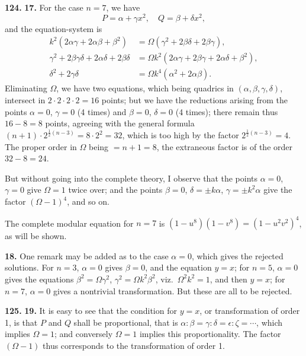 \documentclass[11pt,a4paper]{article}
\theoremstyle{plain}
\begin{document}
\noindent\textbf{124.} \textbf{17.} For the case $n = 7$, we have
\[
P = \alpha + \gamma x^2, \quad Q = \beta + \delta x^2,
\]
and the equation-system is
\begin{align*}
k^2(2\alpha\gamma + 2\alpha\beta + \beta^2) &= \Omega(\gamma^2 + 2\beta\delta + 2\beta\gamma), \\
\gamma^2 + 2\beta\gamma\delta + 2\alpha\delta + 2\beta\delta &= \Omega k^2(2\alpha\gamma + 2\beta\gamma + 2\alpha\delta + \beta^2), \\
\delta^2 + 2\gamma\delta &= \Omega k^4(\alpha^2 + 2\alpha\beta).
\end{align*}
Eliminating $\Omega$, we have two equations, which being quadrics in $(\alpha, \beta, \gamma, \delta)$, intersect in $2 \cdot 2 \cdot 2 \cdot 2 = 16$ points; but we have the reductions arising from the points $\alpha = 0$, $\gamma = 0$ (4 times) and $\beta = 0$, $\delta = 0$ (4 times); there remain thus $16 - 8 = 8$ points, agreeing with the general formula $(n + 1) \cdot 2^{\frac{1}{2}(n-3)} = 8 \cdot 2^2 = 32$, which is too high by the factor $2^{\frac{1}{2}(n-3)} = 4$. The proper order in $\Omega$ being $= n + 1 = 8$, the extraneous factor is of the order $32 - 8 = 24$.

But without going into the complete theory, I observe that the points $\alpha = 0$, $\gamma = 0$ give $\Omega = 1$ twice over; and the points $\beta = 0$, $\delta = \pm k\alpha$, $\gamma = \pm k^2\alpha$ give the factor $(\Omega - 1)^4$, and so on.

The complete modular equation for $n = 7$ is $(1 - u^8)(1 - v^8) = (1 - u^2v^2)^4$, as will be shown.

\medskip
\noindent\textbf{18.} One remark may be added as to the case $\alpha = 0$, which gives the rejected solutions. For $n = 3$, $\alpha = 0$ gives $\beta = 0$, and the equation $y = x$; for $n = 5$, $\alpha = 0$ gives the equations $\beta^2 = \Omega\gamma^2$, $\gamma^2 = \Omega k^2\beta^2$, viz.\ $\Omega^2k^2 = 1$, and then $y = x$; for $n = 7$, $\alpha = 0$ gives a nontrivial transformation. But these are all to be rejected.


\noindent\textbf{125.} \textbf{19.} It is easy to see that the condition for $y = x$, or transformation of order 1, is that $P$ and $Q$ shall be proportional, that is $\alpha : \beta = \gamma : \delta = \epsilon : \zeta = \cdots$, which implies $\Omega = 1$; and conversely $\Omega = 1$ implies this proportionality. The factor $(\Omega - 1)$ thus corresponds to the transformation of order 1.
\end{document}

